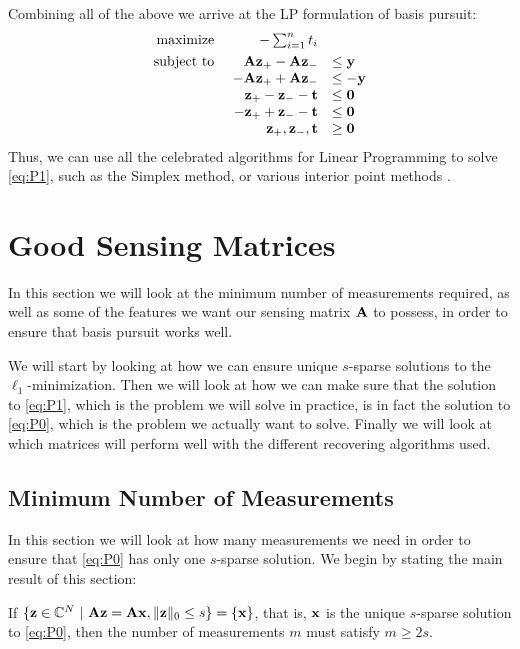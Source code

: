 Combining all of the above we arrive at the LP formulation of basis pursuit:
\begin{equation}
	\begin{array}{r r l l}
		\underset{}{\text{maximize}}~ & -\sum_{i=1}^{n} t_{i}         &          &  \\
		 \quad\text{subject to}~ & \mathbf{A}\mathbf{z}_{+} - \mathbf{A}\mathbf{z}_{-}           & \leq \mathbf{y}  &  \\
		            & -\mathbf{A}\mathbf{z}_{+} + \mathbf{A}\mathbf{z}_{-}          & \leq -\mathbf{y} &  \\
		            & \mathbf{z}_{+} - \mathbf{z}_{-} - \mathbf{t}  & \leq \mathbf{0}  &  \\
		            & -\mathbf{z}_{+} + \mathbf{z}_{-} - \mathbf{t} & \leq \mathbf{0}  &  \\
		            & \mathbf{z}_{+}, \mathbf{z}_{-}, \mathbf{t}    & \geq \mathbf{0}   &
	\end{array}
\end{equation}
Thus, we can use all the celebrated algorithms for Linear Programming to solve \eqref{eq:P1}, such as the Simplex method, or various interior point methods \cite{vanderbei14linprog}.










\section{Good Sensing Matrices}
\label{sec:goodmatrices}
In this section we will look at the minimum number of measurements required, as well as some of the features we want our sensing matrix $ \mathbf{A} $ to possess, in order to ensure that basis pursuit works well. 

We will start by looking at how we can ensure unique $ s $-sparse solutions to the $ \ell_{1} $-minimization. Then we will look at how we can make sure that the solution to \eqref{eq:P1}, which is the problem we will solve in practice, is in fact the solution to \eqref{eq:P0}, which is the problem we actually want to solve. Finally we will look at which matrices will perform well with the different recovering algorithms used.





\subsection{Minimum Number of Measurements}
\label{sec:minimum_measurements}
In this section we will look at how many measurements we need in order to ensure that \eqref{eq:P0} has only one $ s $-sparse solution. We begin by stating the main result of this section:
\begin{theorem}
	\label{thm:minimum_measurements}
	If $ \{\mathbf{z} \in \mathbb{C}^{N} ~|~ \mathbf{A}\mathbf{z} = \mathbf{A}\mathbf{x}, \lVert\mathbf{z}\rVert_{0} \leq s\}  = \{\mathbf{x}\} $, that is, $ \mathbf{x} $ is the unique $ s $-sparse solution to \eqref{eq:P0}, then the number of measurements $ m $ must satisfy $ m \geq 2s $.
\end{theorem}

